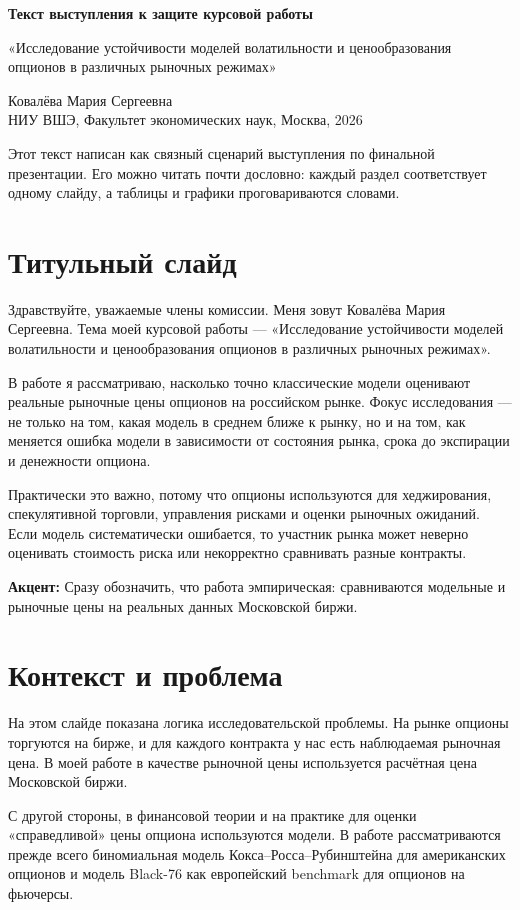 \documentclass[11pt,a4paper]{article}
\newcommand{\slidetitle}[1]{\section{#1}}
\newcommand{\note}[1]{%
  \vspace{0.15em}
  \noindent\colorbox{softblue}{%
    \parbox{\dimexpr\linewidth-2\fboxsep\relax}{\textbf{Акцент:} #1}%
  }\vspace{0.25em}
}
\begin{document}
\begin{center}
{\Large\bfseries Текст выступления к защите курсовой работы\par}
\vspace{0.4em}
{\large «Исследование устойчивости моделей волатильности и ценообразования опционов в различных рыночных режимах»\par}
\vspace{0.6em}
Ковалёва Мария Сергеевна \\
НИУ ВШЭ, Факультет экономических наук, Москва, 2026
\end{center}

\vspace{0.8em}

Этот текст написан как связный сценарий выступления по финальной презентации. Его можно читать почти дословно: каждый раздел соответствует одному слайду, а таблицы и графики проговариваются словами.

\tableofcontents
\newpage

\slidetitle{Титульный слайд}

Здравствуйте, уважаемые члены комиссии. Меня зовут Ковалёва Мария Сергеевна. Тема моей курсовой работы --- «Исследование устойчивости моделей волатильности и ценообразования опционов в различных рыночных режимах».

В работе я рассматриваю, насколько точно классические модели оценивают реальные рыночные цены опционов на российском рынке. Фокус исследования --- не только на том, какая модель в среднем ближе к рынку, но и на том, как меняется ошибка модели в зависимости от состояния рынка, срока до экспирации и денежности опциона.

Практически это важно, потому что опционы используются для хеджирования, спекулятивной торговли, управления рисками и оценки рыночных ожиданий. Если модель систематически ошибается, то участник рынка может неверно оценивать стоимость риска или некорректно сравнивать разные контракты.

\note{Сразу обозначить, что работа эмпирическая: сравниваются модельные и рыночные цены на реальных данных Московской биржи.}

\slidetitle{Контекст и проблема}

На этом слайде показана логика исследовательской проблемы. На рынке опционы торгуются на бирже, и для каждого контракта у нас есть наблюдаемая рыночная цена. В моей работе в качестве рыночной цены используется расчётная цена Московской биржи.

С другой стороны, в финансовой теории и на практике для оценки «справедливой» цены опциона используются модели. В работе рассматриваются прежде всего биномиальная модель Кокса--Росса--Рубинштейна для американских опционов и модель Black-76 как европейский benchmark для опционов на фьючерсы.
\end{document}

